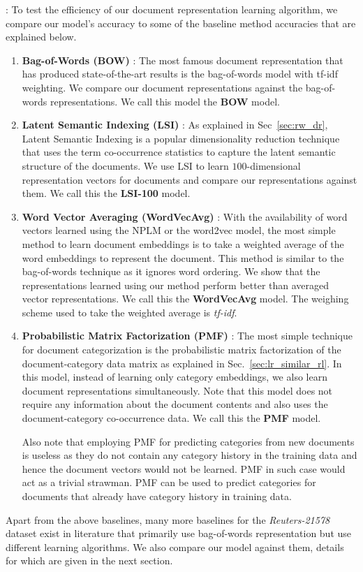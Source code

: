  : To test the efficiency of our document representation learning algorithm, we compare our model's accuracy to some of the baseline method accuracies that are explained below.
\begin{enumerate}
\item \textbf{Bag-of-Words (BOW)} : 
The most famous document representation that has produced state-of-the-art results is the bag-of-words model with tf-idf weighting. We compare our document representations against the bag-of-words representations. We call this model the \textbf{BOW} model.

\item \textbf{Latent Semantic Indexing (LSI)} : 
As explained in Sec~\ref{sec:rw_dr}, Latent Semantic Indexing is a popular dimensionality reduction technique that uses the term co-occurrence statistics to capture the latent semantic structure of the documents. We use LSI to learn $100$-dimensional representation vectors for documents and compare our representations against them.
We call this the \textbf{LSI-100} model.

\item \textbf{Word Vector Averaging (WordVecAvg)} : 
With the availability of word vectors learned using the NPLM or the word2vec model, the most simple method to learn document embeddings is to take a weighted average of the word embeddings to represent the document. This method is similar to the bag-of-words technique as it ignores word ordering. We show that the representations learned using our method perform better than averaged vector representations. We call this the \textbf{WordVecAvg} model. The weighing scheme used to take the weighted average is \emph{tf-idf}.

\item \textbf{Probabilistic Matrix Factorization (PMF)} : 
The most simple technique for document categorization is the probabilistic matrix factorization of the document-category data matrix as explained in Sec.~\ref{sec:lr_similar_rl}. In this model, instead of learning only category embeddings, we also learn document representations simultaneously. Note that this model does not require any information about the document contents and also uses the document-category co-occurrence data. We call this the \textbf{PMF} model.

Also note that employing PMF for predicting categories from new documents is useless as they do not contain any category history in the training data and hence the document vectors would not be learned. PMF in such case would act as a trivial strawman. PMF can be used to predict categories for documents that already have category history in training data. 

\end{enumerate}
Apart from the above baselines, many more baselines for the \emph{Reuters-21578} dataset exist in literature that primarily use bag-of-words representation but use different learning algorithms. We also compare our model against them, details for which are given in the next section.

